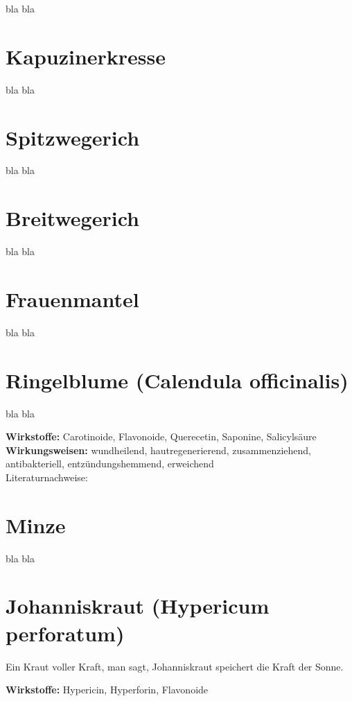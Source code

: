 bla bla

\section{Kapuzinerkresse}

bla bla

\section{Spitzwegerich}

bla bla

\section{Breitwegerich}

bla bla

\section{Frauenmantel}

bla bla

\section{Ringelblume (Calendula officinalis)}

bla bla

\textbf{Wirkstoffe:} Carotinoide, Flavonoide, Querecetin, Saponine, Salicylsäure\\

\textbf{Wirkungsweisen:} wundheilend, hautregenerierend, zusammenziehend, antibakteriell, entzündungshemmend, erweichend \\

Literaturnachweise: \cite{nedoma2018heilsalben}

\section{Minze}

bla bla

\section{Johanniskraut (Hypericum perforatum)}

Ein Kraut voller Kraft, man sagt, Johanniskraut speichert die Kraft der Sonne.

\textbf{Wirkstoffe:} Hypericin, Hyperforin, Flavonoide\\

